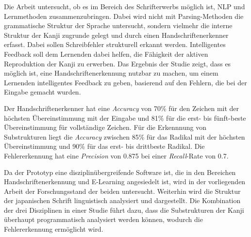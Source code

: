 Die Arbeit untersucht, ob es im Bereich des Schrifterwerbs möglich ist, 
NLP und Lernmethoden zusammenzubringen. Dabei wird nicht mit Parsing-Methoden 
die grammatische Struktur der Sprache untersucht, sondern vielmehr die interne 
Struktur der Kanji zugrunde gelegt und durch einen Handschriftenerkenner erfasst.
Dabei sollen Schreibfehler strukturell erkannt werden. Intelligentes Feedback 
soll dem Lernenden dabei helfen, die Fähigkeit der aktiven Reproduktion der 
Kanji zu erwerben.
Das Ergebnis der Studie zeigt, dass es möglich ist, eine Handschriftenerkennung
nutzbar zu machen, um einem Lernenden intelligentes Feedback zu geben,
basierend auf den Fehlern, die bei der Eingabe gemacht wurden.

Der Handschriftenerkenner hat eine \emph{Accuracy} von 70\% für den Zeichen mit der
höchsten Übereinstimmung mit der Eingabe und
81\% für die erst- bis fünft-beste Übereinstimmung für vollständige Zeichen.
Für die Erkennnung von Substrukturen liegt die \emph{Accuracy} zwischen
85\% für das Radikal mit der höchsten Übereinstimmung und
90\% für das erst- bis drittbeste Radikal.
Die Fehlererkennung hat eine \emph{Precision} von 0.875 bei einer 
\emph{Recall}-Rate von 0.7.

Da der Prototyp eine disziplinübergreifende Software ist, 
die in den Bereichen Handschriftenerkennung und E-Learning angesiedelt ist,
wird in der vorliegenden Arbeit der Forschungsstand der beiden untersucht.
Weiterhin wird die Struktur der japanischen Schrift linguistisch analysiert und
dargestellt. Die Kombination der drei Disziplinen in einer Studie führt dazu, 
dass die Substrukturen der Kanji überhaupt programmatisch analysiert werden 
können, wodurch die Fehlererkennung ermöglicht wird.


